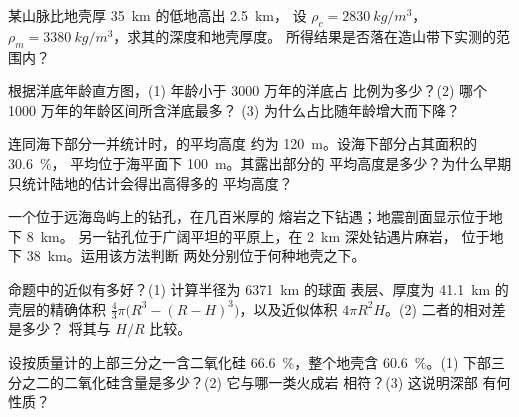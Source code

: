 \begin{exercise}[$\star\star$]\label{exo:g12:continental-crust:8}
某山脉比地壳厚 \qty{35}{km} 的低地高出 \qty{2.5}{km}，
设 $\rho_c = \qty{2830}{kg/m^3}$，$\rho_m =
\qty{3380}{kg/m^3}$，求其的深度和地壳厚度。
所得结果是否落在造山带下实测的范围内？
\end{exercise}

\begin{exercise}[$\star\star$]\label{exo:g12:continental-crust:9}
根据洋底年龄直方图，(1) 年龄小于 3000 万年的洋底占
比例为多少？(2) 哪个 1000 万年的年龄区间所含洋底最多？
(3) 为什么占比随年龄增大而下降？
\end{exercise}

\begin{exercise}[$\star\star$]\label{exo:g12:continental-crust:10}
连同海下部分一并统计时，的平均高度
约为 \qty{120}{m}。设海下部分占其面积的 \qty{30.6}{\percent}，
平均位于海平面下 \qty{100}{m}。其露出部分的
平均高度是多少？为什么早期只统计陆地的估计会得出高得多的
平均高度？
\end{exercise}

\begin{exercise}[$\star\star$]\label{exo:g12:continental-crust:11}
一个位于远海岛屿上的钻孔，在几百米厚的
熔岩之下钻遇；地震剖面显示位于地下 \qty{8}{km}。
另一钻孔位于广阔平坦的平原上，在 \qty{2}{km} 深处钻遇片麻岩，
位于地下 \qty{38}{km}。运用该方法判断
两处分别位于何种地壳之下。
\end{exercise}

\begin{exercise}[$\star\star\star$]\label{exo:g12:continental-crust:12}
命题中的近似有多好？(1) 计算半径为 \qty{6371}{km} 的球面
表层、厚度为 \qty{41.1}{km} 的壳层的精确体积
$\tfrac{4}{3}\pi\bigl(R^3 - (R - H)^3\bigr)$，以及近似体积
$4\pi R^2 H$。(2) 二者的相对差是多少？
将其与 $H/R$ 比较。
\end{exercise}

\begin{exercise}[$\star\star\star$]\label{exo:g12:continental-crust:13}
设按质量计的上部三分之一含二氧化硅
\qty{66.6}{\percent}，整个地壳含 \qty{60.6}{\percent}。(1)
下部三分之二的二氧化硅含量是多少？(2) 它与哪一类火成岩
相符？(3) 这说明深部
有何性质？
\end{exercise}

